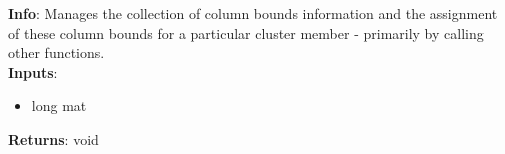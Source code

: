 \textbf{Info}: Manages the collection of column bounds information and the
assignment of these column bounds for a particular cluster member - primarily
 by calling other functions.\\

\noindent \textbf{Inputs}:
\begin{itemize}
\item{long mat}
\end{itemize}

\noindent \textbf{Returns}: void
